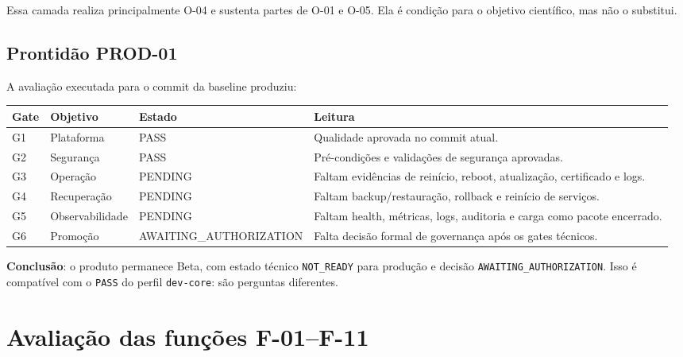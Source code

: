 \documentclass[11pt,a4paper,oneside]{article}
\begin{document}
Essa camada realiza principalmente O-04 e sustenta partes de O-01 e O-05. Ela é condição para o objetivo científico, mas não o substitui.

\subsection{Prontidão PROD-01}

A avaliação executada para o commit da baseline produziu:

\begin{tabularx}{\textwidth}{P{1.4cm}P{3.2cm}P{3.0cm}Y}
\toprule
\textbf{Gate} & \textbf{Objetivo} & \textbf{Estado} & \textbf{Leitura} \\
\midrule
G1 & Plataforma & PASS & Qualidade aprovada no commit atual. \\
G2 & Segurança & PASS & Pré-condições e validações de segurança aprovadas. \\
G3 & Operação & PENDING & Faltam evidências de reinício, reboot, atualização, certificado e logs. \\
G4 & Recuperação & PENDING & Faltam backup/restauração, rollback e reinício de serviços. \\
G5 & Observabilidade & PENDING & Faltam health, métricas, logs, auditoria e carga como pacote encerrado. \\
G6 & Promoção & AWAITING\_AUTHORIZATION & Falta decisão formal de governança após os gates técnicos. \\
\bottomrule
\end{tabularx}

\textbf{Conclusão}: o produto permanece Beta, com estado técnico \texttt{NOT\_READY} para produção e decisão \texttt{AWAITING\_AUTHORIZATION}. Isso é compatível com o \texttt{PASS} do perfil \texttt{dev-core}: são perguntas diferentes.

\section{Avaliação das funções F-01--F-11}
\end{document}
